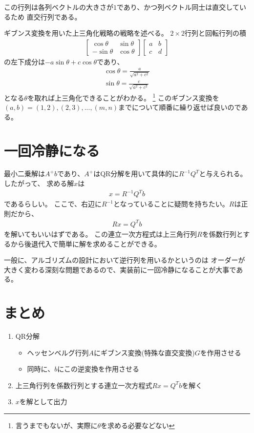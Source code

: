 \documentclass{jarticle}
\begin{document}
この行列は各列ベクトルの大きさが$1$であり、かつ列ベクトル同士は直交しているため
直交行列である。
\par
ギブンス変換を用いた上三角化戦略の戦略を述べる。
$2\times 2$行列と回転行列の積
\begin{align}
\begin{bmatrix}
 \cos \theta    & \sin \theta \\
-\sin \theta    & \cos \theta 
\end{bmatrix}
\begin{bmatrix}
 a & b \\ c & d
\end{bmatrix}
\end{align}
の左下成分は$-a\sin\theta+c\cos\theta$であり、
\begin{align}
\cos \theta = \frac{a}{\sqrt{a^2+c^2}}
\\
\sin \theta = \frac{c}{\sqrt{a^2+c^2}}
\end{align}
となる$\theta$を取れば上三角化できることがわかる。
\footnote{
    言うまでもないが、実際に$\theta$を求める必要などない
}
このギブンス変換を$(a,b)=(1,2),(2,3),...,(m,n)$までについて順番に繰り返せば良いのである。

\section{一回冷静になる}
最小二乗解は$A^{+}b$であり、$A^{+}$はQR分解を用いて具体的に$R^{-1}Q^T$と与えられる。したがって、
求める解$x$は
\begin{align}
x = R^{-1}Q^Tb
\end{align}
であるらしい。
ここで、右辺に$R^{-1}$となっていることに疑問を持ちたい。$R$は正則だから、
\begin{align}
Rx = Q^Tb
\end{align}
を解いてもいいはずである。
この連立一次方程式は上三角行列$R$を係数行列とするから後退代入で簡単に解を求めることができる。
\par
一般に、アルゴリズムの設計において逆行列を用いるかというのは
オーダーが大きく変わる深刻な問題であるので、実装前に一回冷静になることが大事である。
\section{まとめ}
\begin{enumerate}
\item QR分解
\begin{itemize}
\item ヘッセンベルグ行列$A$にギブンス変換(特殊な直交変換)$G$を作用させる
\item 同時に、$b$にこの逆変換を作用させる
\end{itemize}
\item 上三角行列を係数行列とする連立一次方程式$Rx=Q^Tb$を解く
\item $x$を解として出力
\end{enumerate}
\end{document}
